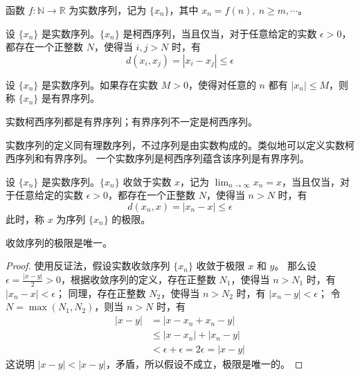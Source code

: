 \begin{definition}
    函数 $f:\mathbb{N}\to\mathbb{R}$ 为实数序列，记为 $\{x_n\}$，其中 $x_n=f(n),\ n\ge m,\cdots$。
\end{definition}

\begin{definition}
    设 $\{x_n\}$ 是实数序列。$\{x_n\}$ 是柯西序列，当且仅当，对于任意给定的实数 $\epsilon>0$，都存在一个正整数 $N$，使得当 $i,j>N$ 时，有
    \[
        d(x_i,x_j) = |x_i - x_j| \le \epsilon
    \]
\end{definition}

\begin{definition}
    设 $\{x_n\}$ 是实数序列。如果存在实数 $M>0$，使得对任意的 $n$ 都有 $|x_n|\le M$，则称 $\{x_n\}$ 是有界序列。
\end{definition}

\begin{theorem}
    实数柯西序列都是有界序列；有界序列不一定是柯西序列。
\end{theorem}

\begin{note}
    实数序列的定义同有理数序列，不过序列是由实数构成的。类似地可以定义实数柯西序列和有界序列。
    一个实数序列是柯西序列蕴含该序列是有界序列。
\end{note}
\vspace{1em}

\begin{definition}
    设 $\{x_n\}$ 是实数序列。$\{x_n\}$ 收敛于实数 $x$，记为 $\lim_{n\to\infty} x_n = x$，当且仅当，对于任意给定的实数 $\epsilon>0$，都存在一个正整数 $N$，使得当 $n>N$ 时，有
    \[
        d(x_n,x) = |x_n - x| \le \epsilon
    \]
    此时，称 $x$ 为序列 $\{x_n\}$ 的极限。
\end{definition}

\begin{proposition}
    收敛序列的极限是唯一。
\end{proposition}
\begin{proof}
    使用反证法，假设实数收敛序列 $\{x_n\}$ 收敛于极限 $x$ 和 $y$。
    那么设 $ \epsilon = \frac{|x-y|}{2} > 0 $，根据收敛序列的定义，存在正整数 $N_1$，使得当 $n>N_1$ 时，有 $|x_n - x| < \epsilon$；
    同理，存在正整数 $N_2$，使得当 $n>N_2$ 时，有 $|x_n - y| < \epsilon$；
    令 $N=\max(N_1,N_2)$，则当 $n>N$ 时，有
    \begin{align*}
        |x - y| &= |x - x_n + x_n - y| \\
        &\le |x - x_n| + |x_n - y| \\
        &< \epsilon + \epsilon = 2\epsilon = |x-y|
    \end{align*}
    这说明 $|x-y| < |x-y|$，矛盾，所以假设不成立，极限是唯一的。
\end{proof}
\vspace{1em}

